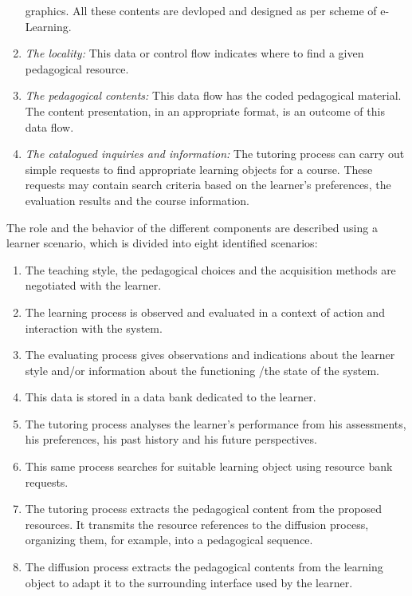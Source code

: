 \begin{enumerate}
    graphics. All these contents are devloped and designed as per scheme of e-Learning.
\item  \textit{The locality:} This data or control flow indicates where to find a given pedagogical resource.
\item  \textit{The pedagogical contents:} This data flow has the coded pedagogical material. The content presentation, in an appropriate format, is an
    outcome of this data flow.
\item  \textit{The catalogued inquiries and information:} The tutoring process can carry out
    simple requests to find appropriate learning objects for a course. These requests
    may contain search criteria based on the learner’s preferences, the evaluation
    results and the course information.

\end{enumerate}
   The role and the behavior of the different components are described using a
learner scenario, which is divided into eight identified scenarios:
\begin{enumerate}
 \item The teaching style, the pedagogical choices and the acquisition methods are
negotiated with the learner.
\item The learning process is observed and evaluated in a context of action and
interaction with the system.
\item The evaluating process gives observations and indications about the learner
style and/or information about the functioning /the state of the system.
\item This data is stored in a data bank dedicated to the learner.
\item The tutoring process analyses the learner’s performance from his assessments,
his preferences, his past history and his future perspectives.
\item This same process searches for suitable learning object using resource bank
requests.
\item The tutoring process extracts the pedagogical content from the proposed
resources. It transmits the resource references to the diffusion process, organizing
them, for example, into a pedagogical sequence.
\item The diffusion process extracts the pedagogical contents from the learning
object to adapt it to the surrounding interface used by the learner.

\end{enumerate}


